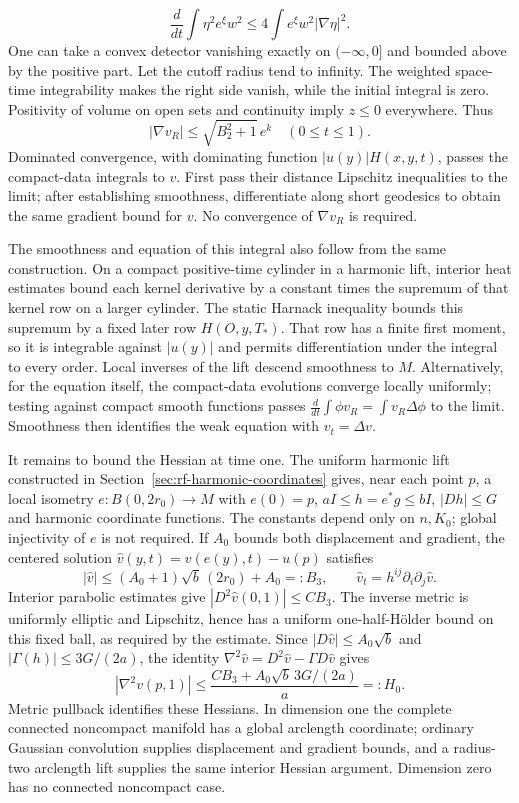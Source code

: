 \[
 \frac d{dt}\int\eta^2e^\xi w^2
       \leq4\int e^\xi w^2|\nabla\eta|^2.
\]
One can take a convex detector vanishing exactly on $(-\infty,0]$
and bounded above by the positive part.  Let the cutoff radius tend
to infinity.  The weighted space-time integrability makes the right
side vanish, while the initial integral is zero.  Positivity of
volume on open sets and continuity imply $z\leq0$ everywhere.
Thus
\[
 |\nabla v_R|\leq\sqrt{B_2^2+1}\,e^k\quad(0\leq t\leq1).
\]
Dominated convergence, with dominating function $|u(y)|H(x,y,t)$,
passes the compact-data integrals to $v$.  First pass their distance
Lipschitz inequalities to the limit; after establishing smoothness,
differentiate along short geodesics to obtain the same gradient bound
for $v$.  No convergence of $\nabla v_R$ is required.

The smoothness and equation of this integral also follow from the
same construction.  On a compact positive-time cylinder in a
harmonic lift, interior heat estimates bound each kernel derivative
by a constant times the supremum of that kernel row on a larger
cylinder.  The static Harnack inequality bounds this supremum by a
fixed later row $H(O,y,T_*)$.  That row has a finite first moment, so
it is integrable against $|u(y)|$ and permits differentiation under
the integral to every order.  Local inverses of the lift descend
smoothness to $M$.  Alternatively, for the equation itself, the
compact-data evolutions converge locally uniformly; testing against
compact smooth functions passes
$\frac d{dt}\int\phi v_R=\int v_R\Delta\phi$ to the limit.
Smoothness then identifies the weak equation with $v_t=\Delta v$.

It remains to bound the Hessian at time one.  The uniform harmonic
lift constructed in Section~\ref{sec:rf-harmonic-coordinates} gives,
near each point $p$, a local isometry $e:B(0,2r_0)\to M$ with
$e(0)=p$, $aI\leq h=e^*g\leq bI$, $|Dh|\leq G$ and harmonic
coordinate functions.  The constants depend only on $n,K_0$;
global injectivity of $e$ is not required.  If $A_0$ bounds both
displacement and gradient, the centered solution
$\widehat v(y,t)=v(e(y),t)-u(p)$ satisfies
\[
 |\widehat v|\leq (A_0+1)\sqrt b\,(2r_0)+A_0=:B_3,
 \qquad \widehat v_t=h^{ij}\partial_i\partial_j\widehat v.
\]
Interior parabolic estimates give $|D^2\widehat v(0,1)|\leq C B_3$.
The inverse metric is uniformly elliptic and Lipschitz, hence has
a uniform one-half-H\"older bound on this fixed ball, as required
by the estimate.  Since $|D\widehat v|\leq A_0\sqrt b$ and
$|\Gamma(h)|\leq3G/(2a)$, the identity
$\nabla^2\widehat v=D^2\widehat v-\Gamma D\widehat v$ gives
\[
 |\nabla^2v(p,1)|\leq
 \frac{CB_3+A_0\sqrt b\,3G/(2a)}a=:H_0.
\]
Metric pullback identifies these Hessians.  In dimension one the
complete connected noncompact manifold has a global arclength
coordinate; ordinary Gaussian convolution supplies displacement and
gradient bounds, and a radius-two arclength lift supplies the same
interior Hessian argument.  Dimension zero has no connected
noncompact case.

